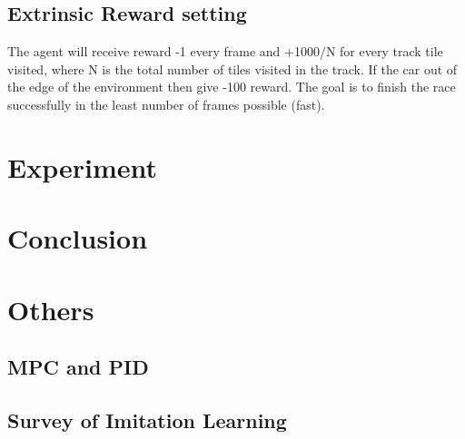 \documentclass{article}
\begin{document}
\subsection{Extrinsic Reward setting}
The agent will receive reward -1 every frame and +1000/N
for every track tile visited, where N is the total number of tiles
visited in the track. If the car out of the edge of the environment then give -100 reward. The goal is to finish the race successfully in the least number of frames possible (fast). 

\section{Experiment}

\section{Conclusion}

\section{Others}
\subsection{MPC and PID}
\subsection{Survey of Imitation Learning}




\end{document}
